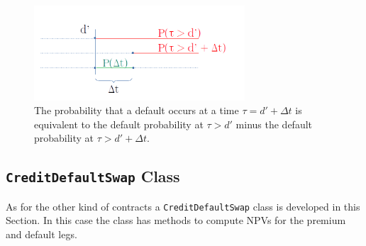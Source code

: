 \begin{figure}[htb]
	\centering
	\includegraphics[width=0.7\textwidth]{figures/timeline.png}
	\caption{The probability that a default occurs at a time $\tau = d'+\Delta t$ is equivalent to the default probability at $\tau > d'$ minus the default probability at $\tau>d'+\Delta t$.}
	\label{fig:default_p}
\end{figure}

\subsection{\texttt{CreditDefaultSwap} Class}

As for the other kind of contracts a \texttt{CreditDefaultSwap} class is developed in this Section. In this case the class has methods to compute NPVs for the premium and default legs.

